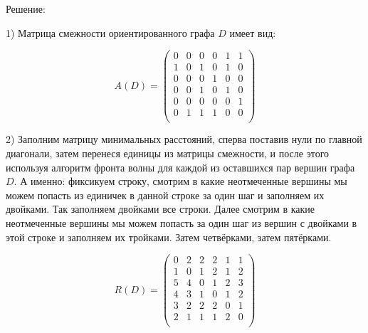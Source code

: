 \documentclass[fleqn]{article}
\begin{document}

\begin{center}Решение:\end{center}

1) Матрица смежности ориентированного графа $D$ имеет вид:

$$A(D)=
\begin{pmatrix}
0 & 0 & 0 & 0 & 1 & 1 \\
1 & 0 & 1 & 0 & 1 & 0 \\
0 & 0 & 0 & 1 & 0 & 0 \\
0 & 0 & 1 & 0 & 1 & 0 \\
0 & 0 & 0 & 0 & 0 & 1 \\
0 & 1 & 1 & 1 & 0 & 0 \\
\end{pmatrix}
$$

2) Заполним матрицу минимальных расстояний, сперва поставив нули по главной диагонали, затем перенеся единицы из матрицы смежности, и после этого используя алгоритм фронта волны для каждой из оставшихся пар вершин графа $D$. А именно: фиксикуем строку, смотрим в какие неотмеченные вершины мы можем попасть из единичек в данной строке за один шаг и заполняем их двойками. Так заполняем двойками все строки. Далее смотрим в какие неотмеченные вершины мы можем попасть за один шаг из вершин с двойками в этой строке и заполняем их тройками. Затем четвёрками, затем пятёрками.

$$R(D)=
\begin{pmatrix}
0 & 2 & 2 & 2 & 1 & 1 \\
1 & 0 & 1 & 2 & 1 & 2 \\
5 & 4 & 0 & 1 & 2 & 3 \\
4 & 3 & 1 & 0 & 1 & 2 \\
3 & 2 & 2 & 2 & 0 & 1 \\
2 & 1 & 1 & 1 & 2 & 0 \\
\end{pmatrix}
$$
\end{document}
